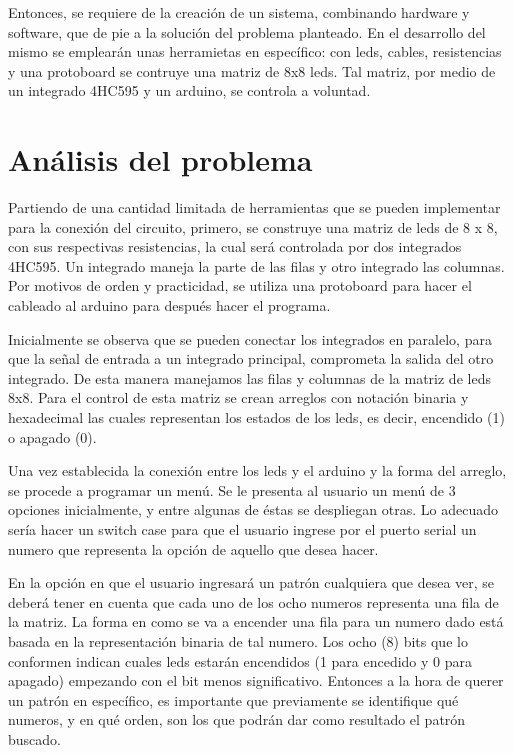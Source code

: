 \documentclass{article}
\begin{document}
Entonces, se requiere de la creación de un sistema, combinando hardware y software, que de pie a la solución del problema planteado. En el desarrollo del mismo se emplearán unas herramietas en específico: con leds, cables, resistencias y una protoboard se contruye una matriz de 8x8 leds. 
Tal matriz, por medio de un integrado 4HC595 y un arduino, se controla a voluntad. 

\section{Análisis del problema} \label{contenido}
Partiendo de una cantidad limitada de herramientas que se pueden implementar para la conexión del circuito, primero, se construye una matriz de leds de 8 x 8, con sus respectivas resistencias, la cual será controlada por dos integrados 4HC595. Un integrado maneja la parte de las filas y otro integrado las columnas. Por motivos de orden y practicidad, se utiliza una protoboard para hacer el cableado al arduino para después hacer el programa.
\newline

Inicialmente se observa que se pueden conectar los integrados en paralelo, para que la señal de entrada a un integrado principal, comprometa la salida del otro integrado. De esta manera manejamos las filas y columnas de la matriz de leds 8x8.
Para el control de esta matriz se crean arreglos con notación binaria y hexadecimal las cuales representan los estados de los leds, es decir, encendido (1) o apagado (0).
\newline

Una vez establecida la conexión entre los leds y el arduino y la forma del arreglo, se procede a programar un menú.
Se le presenta al usuario un menú de 3 opciones inicialmente, y entre algunas de éstas se despliegan otras. Lo adecuado sería hacer un switch case para que el usuario ingrese por el puerto serial un numero que representa la opción de aquello que desea hacer. 
\newline

En la opción en que el usuario ingresará un patrón cualquiera que desea ver, se deberá tener en cuenta que cada uno de los ocho numeros representa una fila de la matriz. La forma en como se va a encender una fila para un numero dado está basada en la representación binaria de tal numero. Los ocho (8) bits que lo conformen indican cuales leds estarán encendidos (1 para encedido y 0 para apagado) empezando con el bit menos significativo. 
Entonces a la hora de querer un patrón en específico, es importante que previamente se identifique qué numeros, y en qué orden, son los que podrán dar como resultado el patrón buscado. 
\end{document}
